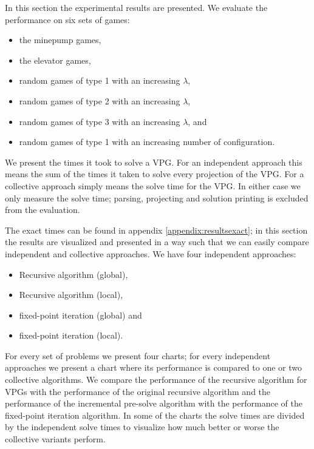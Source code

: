 In this section the experimental results are presented. We evaluate the performance on six sets of games:
\begin{itemize}
	\item the minepump games,
	\item the elevator games,
	\item random games of type 1 with an increasing $\lambda$,
	\item random games of type 2 with an increasing $\lambda$,
	\item random games of type 3 with an increasing $\lambda$, and
	\item random games of type 1 with an increasing number of configuration.
\end{itemize}

We present the times it took to solve a VPG. For an independent approach this means the sum of the times it taken to solve every projection of the VPG. For a collective approach simply means the solve time for the VPG. In either case we only measure the solve time; parsing, projecting and solution printing is excluded from the evaluation.

The exact times can be found in appendix \ref{appendix:resultsexact}; in this section the results are visualized and presented in a way such that we can easily compare independent and collective approaches. We have four independent approaches:
\begin{itemize}
	\item Recursive algorithm (global),
	\item Recursive algorithm (local),
	\item fixed-point iteration (global) and
	\item fixed-point iteration (local).
\end{itemize}
For every set of problems we present four charts; for every independent approaches we present a chart where its performance is compared to one or two collective algorithms. We compare the performance of the recursive algorithm for VPGs with the performance of the original recursive algorithm and the performance of the incremental pre-solve algorithm with the performance of the fixed-point iteration algorithm. In some of the charts the solve times are divided by the independent solve times to visualize how much better or worse the collective variants perform.


